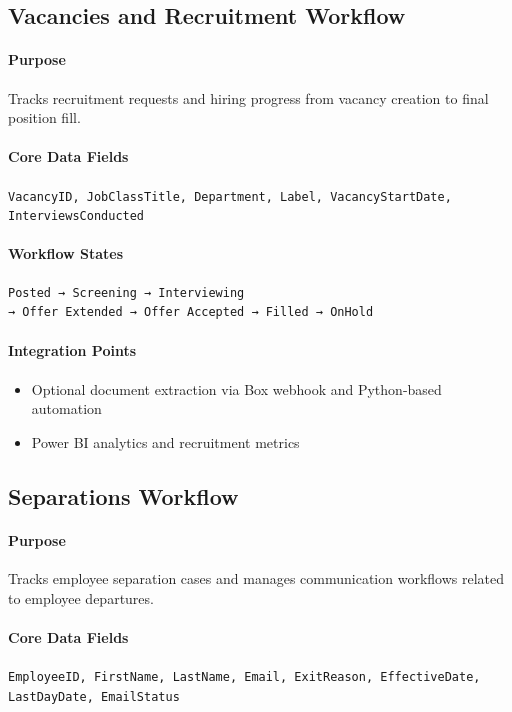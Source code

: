 \documentclass[12pt]{article}
\begin{document}
\subsection{Vacancies and Recruitment Workflow}

\paragraph{Purpose}
Tracks recruitment requests and hiring progress from vacancy creation to final position fill.

\paragraph{Core Data Fields}
\texttt{VacancyID, JobClassTitle, Department, Label, VacancyStartDate, InterviewsConducted}

\paragraph{Workflow States}
\begin{verbatim}
Posted → Screening → Interviewing
→ Offer Extended → Offer Accepted → Filled → OnHold
\end{verbatim}

\paragraph{Integration Points}
\begin{itemize}
    \item Optional document extraction via Box webhook and Python-based automation
    \item Power BI analytics and recruitment metrics
\end{itemize}

\subsection{Separations Workflow}

\paragraph{Purpose}
Tracks employee separation cases and manages communication workflows related to employee departures.

\paragraph{Core Data Fields}
\texttt{EmployeeID, FirstName, LastName, Email, ExitReason, EffectiveDate, LastDayDate, EmailStatus}
\end{document}
